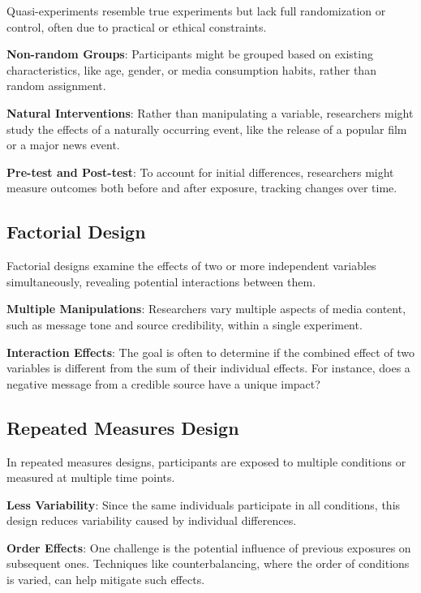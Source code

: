 \documentclass[
  b5paper]{book}
\begin{document}
Quasi-experiments resemble true experiments but lack full randomization or control, often due to practical or ethical constraints.

\textbf{Non-random Groups}: Participants might be grouped based on existing characteristics, like age, gender, or media consumption habits, rather than random assignment.

\textbf{Natural Interventions}: Rather than manipulating a variable, researchers might study the effects of a naturally occurring event, like the release of a popular film or a major news event.

\textbf{Pre-test and Post-test}: To account for initial differences, researchers might measure outcomes both before and after exposure, tracking changes over time.

\hypertarget{factorial-design}{%
\subsection*{Factorial Design}\label{factorial-design}}

Factorial designs examine the effects of two or more independent variables simultaneously, revealing potential interactions between them.

\textbf{Multiple Manipulations}: Researchers vary multiple aspects of media content, such as message tone and source credibility, within a single experiment.

\textbf{Interaction Effects}: The goal is often to determine if the combined effect of two variables is different from the sum of their individual effects. For instance, does a negative message from a credible source have a unique impact?

\hypertarget{repeated-measures-design}{%
\subsection*{Repeated Measures Design}\label{repeated-measures-design}}

In repeated measures designs, participants are exposed to multiple conditions or measured at multiple time points.

\textbf{Less Variability}: Since the same individuals participate in all conditions, this design reduces variability caused by individual differences.

\textbf{Order Effects}: One challenge is the potential influence of previous exposures on subsequent ones. Techniques like counterbalancing, where the order of conditions is varied, can help mitigate such effects.
\end{document}
